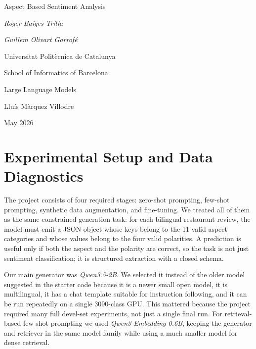 \documentclass[11pt,a4paper]{article}
\begin{document}
\begin{titlepage}
    \centering
    \vspace*{3cm}
    {\huge Aspect Based Sentiment Analysis \par}
    \vspace{2.3cm}
    {\Large \itshape Roger Baiges Trilla \par}
    \vspace{0.2cm}
    {\Large \itshape Guillem Olivart Garrofé \par}
    \vspace{2.3cm}
    {\Large Universitat Politècnica de Catalunya \par}
    \vspace{0.2cm}
    {\Large School of Informatics of Barcelona \par}
    \vspace{0.5cm}
    {\large Large Language Models \par}
    \vfill
    {\large Lluís Màrquez Villodre \par}
    \vspace{1.3cm}
    {\large May 2026 \par}
\end{titlepage}
\clearpage
{}

\section{Experimental Setup and Data Diagnostics}

The project consists of four required stages: zero-shot prompting, few-shot prompting, synthetic data augmentation, and fine-tuning. We treated all of them as the same constrained generation task: for each bilingual restaurant review, the model must emit a JSON object whose keys belong to the 11 valid aspect categories and whose values belong to the four valid polarities. A prediction is useful only if both the aspect and the polarity are correct, so the task is not just sentiment classification; it is structured extraction with a closed schema.

Our main generator was \textit{Qwen3.5-2B}. We selected it instead of the older model suggested in the starter code because it is a newer small open model, it is multilingual, it has a chat template suitable for instruction following, and it can be run repeatedly on a single 3090-class GPU. This mattered because the project required many full devel-set experiments, not just a single final run. For retrieval-based few-shot prompting we used \textit{Qwen3-Embedding-0.6B}, keeping the generator and retriever in the same model family while using a much smaller model for dense retrieval.
\end{document}
